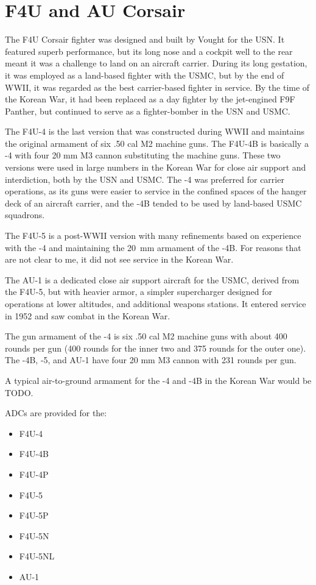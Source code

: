 \section*{F4U and AU Corsair}

The F4U Corsair fighter was designed and built by Vought for the USN. It featured superb performance, but its long nose and a cockpit well to the rear meant it was a challenge to land on an aircraft carrier. During its long gestation, it was employed as a land-based fighter with the USMC, but by the end of WWII, it was regarded as the best carrier-based fighter in service. By the time of the Korean War, it had been replaced as a day fighter by the jet-engined F9F Panther, but continued to serve as a fighter-bomber in the USN and USMC.

The F4U-4 is the last version that was constructed during WWII and maintains the original armament of six .50 cal M2 machine guns. The F4U-4B is basically a -4 with four 20 mm M3 cannon substituting the machine guns. These two versions were used in large numbers in the Korean War for close air support and interdiction, both by the USN and USMC. The -4 was preferred for carrier operations, as its guns were easier to service in the confined spaces of the hanger deck of an aircraft carrier, and the -4B tended to be used by land-based USMC squadrons.

The F4U-5 is a post-WWII version with many refinements based on experience with the -4 and maintaining the 20~mm armament of the -4B. For reasons that are not clear to me, it did not see service in the Korean War.

The AU-1 is a dedicated close air support aircraft for the USMC, derived from the F4U-5, but with heavier armor, a simpler supercharger designed for operations at lower altitudes, and additional weapons stations. It entered service in 1952 and saw combat in the Korean War.

The gun armament of the -4 is six .50 cal M2 machine guns with about 400 rounds per gun (400 rounds for the inner two and 375 rounds for the outer one). The -4B, -5, and AU-1 have four 20 mm M3 cannon with 231 rounds per gun. 

A typical air-to-ground armament for the -4 and -4B in the Korean War would be TODO. 

ADCs are provided for the:
\begin{itemize}
\item F4U-4
\item F4U-4B
\item F4U-4P
\item F4U-5
\item F4U-5P
\item F4U-5N
\item F4U-5NL
\item AU-1
\end{itemize}
